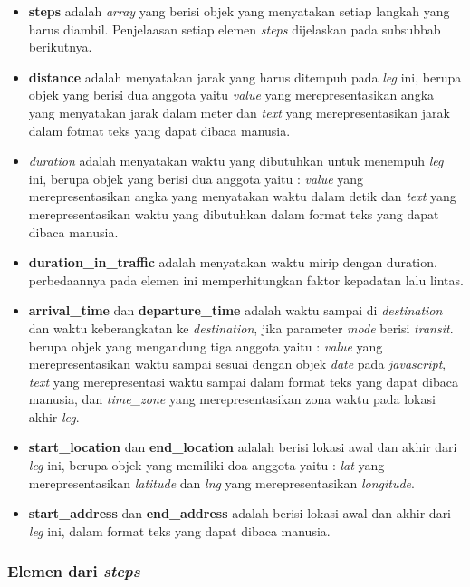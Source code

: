 \begin{itemize}
	\item \textbf{steps} adalah \textit{array} yang berisi objek yang menyatakan setiap langkah yang harus diambil. Penjelaasan setiap elemen \textit{steps} dijelaskan pada subsubbab berikutnya.
	\item \textbf{distance} adalah menyatakan jarak yang harus ditempuh pada \textit{leg} ini, berupa objek yang berisi dua anggota yaitu \textit{value} yang merepresentasikan angka yang menyatakan jarak dalam meter dan \textit{text} yang merepresentasikan jarak dalam fotmat teks yang dapat dibaca manusia.
	\item \textit{duration} adalah menyatakan waktu yang dibutuhkan untuk menempuh \textit{leg} ini, berupa objek yang berisi dua anggota yaitu : \textit{value} yang merepresentasikan angka yang menyatakan waktu dalam detik dan \textit{text} yang merepresentasikan waktu yang dibutuhkan dalam format teks yang dapat dibaca manusia.
	\item \textbf{duration\_in\_traffic} adalah menyatakan waktu mirip dengan duration. perbedaannya pada elemen ini memperhitungkan faktor kepadatan lalu lintas.
	\item \textbf{arrival\_time} dan \textbf{departure\_time} adalah waktu sampai di \textit{destination} dan waktu keberangkatan ke \textit{destination}, jika parameter \textit{mode} berisi \textit{transit}. berupa objek yang mengandung tiga anggota yaitu : \textit{value} yang merepresentasikan waktu sampai sesuai dengan objek \textit{date} pada \textit{javascript}, \textit{text} yang merepresentasi waktu sampai dalam format teks yang dapat dibaca manusia, dan \textit{time\_zone} yang merepresentasikan zona waktu pada lokasi akhir \textit{leg}.
	\item \textbf{start\_location} dan \textbf{end\_location} adalah berisi lokasi awal dan akhir dari \textit{leg} ini, berupa objek yang memiliki doa anggota yaitu : \textit{lat} yang merepresentasikan \textit{latitude} dan \textit{lng} yang merepresentasikan \textit{longitude}.
	\item \textbf{start\_address} dan \textbf{end\_address} adalah berisi lokasi awal dan akhir dari \textit{leg} ini, dalam format teks yang dapat dibaca manusia.
\end{itemize}

\subsubsection{Elemen dari \textit{steps}}
\label{subsubsec:elemensteps}

